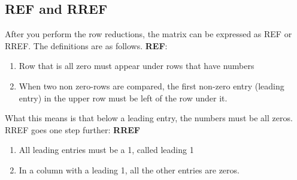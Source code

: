 \documentclass[12pt]{article}
\begin{document}
\subsection{REF and RREF}
After you perform the row reductions, the matrix can be expressed as REF or RREF. The definitions are as follows. \cite{Textbook}
\noindent
\textbf{REF}: 
\begin{enumerate}
\item Row that is all zero must appear under rows that have numbers
\item When two non zero-rows are compared, the first non-zero entry (leading entry) in the upper row must be left of the row under it.
\end{enumerate}
What this means is that below a leading entry, the numbers must be all zeros.\\
RREF goes one step further:
\noindent
\textbf{RREF}
\begin{enumerate}
\item All leading entries must be a 1, called leading 1
\item In a column with a leading 1, all the other entries are zeros.
\end{enumerate}
\end{document}
